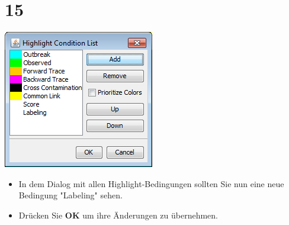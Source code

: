 \documentclass{beamer}
\begin{document}
\section{15}
\begin{frame}
	\begin{center}
  		\includegraphics[height=0.6\textheight]{15.png}
	\end{center}
	\begin{itemize}
		\item In dem Dialog mit allen Highlight-Bedingungen sollten Sie nun eine neue Bedingung "Labeling" sehen.
		\item Drücken Sie \textbf{OK} um ihre Änderungen zu übernehmen.
	\end{itemize}
\end{frame}
\end{document}
